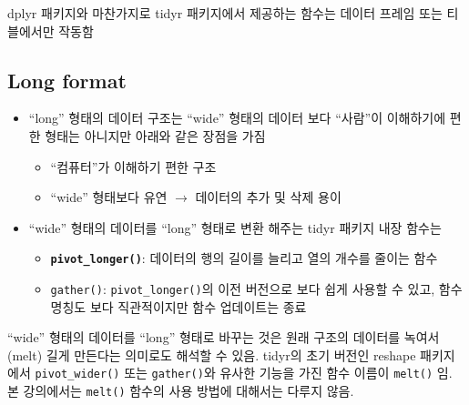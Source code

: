 \documentclass[
  11pt,
]{krantz}
\makeatletter
\providecommand{\tightlist}{%
  \setlength{\itemsep}{0pt}\setlength{\parskip}{0pt}}
\newenvironment{kframe}{%
\medskip{}
\setlength{\fboxsep}{.8em}
 \def\at@end@of@kframe{}%
 \ifinner\ifhmode%
  \def\at@end@of@kframe{\end{minipage}}%
  \begin{minipage}{\columnwidth}%
 \fi\fi%
 \def\FrameCommand##1{\hskip\@totalleftmargin \hskip-\fboxsep
 \colorbox{shadecolor}{##1}\hskip-\fboxsep
     \hskip-\linewidth \hskip-\@totalleftmargin \hskip\columnwidth}%
 \MakeFramed {\advance\hsize-\width
   \@totalleftmargin\z@ \linewidth\hsize
   \@setminipage}}%
 {\par\unskip\endMakeFramed%
 \at@end@of@kframe}
\newenvironment{rmdblock}[1]
  {
  \begin{itemize}
  \renewcommand{\labelitemi}{
    \raisebox{-.7\height}[0pt][0pt]{
      {\setkeys{Gin}{width=3em,keepaspectratio}\texttt{[image: images/\#1]}}
    }
  }
  \setlength{\fboxsep}{1em}
  \begin{kframe}
  \item
  }
  {
  \end{kframe}
  \end{itemize}
  }
\newenvironment{rmdcaution}
  {\begin{rmdblock}{caution}}
  {\end{rmdblock}}
\renewenvironment{quote}{\begin{kframe}}{\end{kframe}}
\makeatother
\begin{document}
\normalsize

\footnotesize

\begin{rmdcaution}
\begin{rmdcaution}

dplyr 패키지와 마찬가지로 tidyr 패키지에서 제공하는 함수는 데이터 프레임 또는 티블에서만 작동함

\end{rmdcaution}
\end{rmdcaution}

\normalsize

\hypertarget{long-format}{%
\subsection{Long format}\label{long-format}}

\begin{itemize}
\tightlist
\item
  ``long'' 형태의 데이터 구조는 ``wide'' 형태의 데이터 보다 ``사람''이 이해하기에 편한 형태는 아니지만 아래와 같은 장점을 가짐

  \begin{itemize}
  \tightlist
  \item
    ``컴퓨터''가 이해하기 편한 구조
  \item
    ``wide'' 형태보다 유연 \(\rightarrow\) 데이터의 추가 및 삭제 용이
  \end{itemize}
\item
  ``wide'' 형태의 데이터를 ``long'' 형태로 변환 해주는 tidyr 패키지 내장 함수는

  \begin{itemize}
  \tightlist
  \item
    \textbf{\texttt{pivot\_longer()}}: 데이터의 행의 길이를 늘리고 열의 개수를 줄이는 함수
  \item
    \texttt{gather()}: \texttt{pivot\_longer()}의 이전 버전으로 보다 쉽게 사용할 수 있고, 함수 명칭도 보다 직관적이지만 함수 업데이트는 종료
  \end{itemize}
\end{itemize}

\begin{quote}
``wide'' 형태의 데이터를 ``long'' 형태로 바꾸는 것은 원래 구조의 데이터를 녹여서(melt) 길게 만든다는 의미로도 해석할 수 있음. tidyr의 초기 버전인 reshape 패키지에서 \texttt{pivot\_wider()} 또는 \texttt{gather()}와 유사한 기능을 가진 함수 이름이 \texttt{melt()} 임. 본 강의에서는 \texttt{melt()} 함수의 사용 방법에 대해서는 다루지 않음.
\end{quote}
\end{document}
